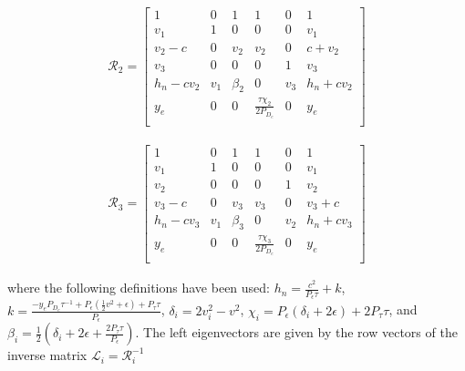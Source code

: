 \begin{align*}
  \mathcal{R}_{2} =
  \left[
  \begin{array}{cccccc}
    1 & 0 & 1 & 1 & 0 & 1 \\
    v_{1} & 1 & 0 & 0 & 0 & v_{1} \\
    v_{2}-c & 0 & v_{2} & v_{2} & 0 & c+v_{2} \\
    v_{3} & 0 & 0 & 0 & 1 & v_{3} \\
    h_{n}-c v_{2} & v_{1} & \beta_{2} & 0 & v_{3} & h_{n}+c v_{2} \\
    y_{e}  & 0 & 0 & \frac{\tau  \chi_{2} }{2 P_{D_{e}}} & 0 & y_{e}  \\
  \end{array}
  \right]
\end{align*}

\begin{align*}
  \mathcal{R}_{3} =
  \left[
  \begin{array}{cccccc}
    1 & 0 & 1 & 1 & 0 & 1 \\
    v_{1} & 1 & 0 & 0 & 0 & v_{1} \\
    v_{2} & 0 & 0 & 0 & 1 & v_{2} \\
    v_{3}-c & 0 & v_{3} & v_{3} & 0 & v_{3}+c \\
    h_{n}-c v_{3} & v_{1} & \beta_{3} & 0 & v_{2} & h_{n}+c v_{3} \\
    y_{e}  & 0 & 0 & \frac{\tau  \chi_{3} }{2 P_{D_{e}}} & 0 & y_{e}  \\
  \end{array}
  \right]
\end{align*}

where the following definitions have been used:
$h_{n} = \frac{c^2}{P_{\epsilon}\tau} + k $, $k = \frac{-y_{e} P_{D_{e}} \tau^{-1}
+ P_{\epsilon} (\frac{1}{2}v^2 + \epsilon) + P_{\tau}\tau}{P_{\epsilon}}$,
$\delta_{i} = 2v_{i}^{2}-v^{2}$,
$\chi_{i} = P_{\epsilon} ( \delta_{i} + 2\epsilon) + 2P_{\tau}\tau$, and
$\beta_{i} = \frac{1}{2} (\delta_{i}+2 \epsilon +\frac{2 P_{\tau} \tau }{P_{\epsilon}})$.
The left eigenvectors are given by the row vectors of the inverse matrix $\mathcal{L}_{i} = \mathcal{R}_{i}^{-1}$

